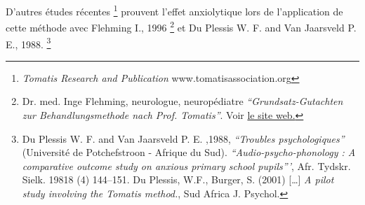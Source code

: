 D'autres études récentes \footnote{\emph{Tomatis Research and Publication} www.tomatisassociation.org}  prouvent l'effet anxiolytique lors de
l'application de cette
méthode avec Flehming
I., 1996 \footnote{Dr. med. Inge Flehming,
	neurologue, neuropédiatre \emph{``Grundsatz-Gutachten zur Behandlungsmethode
		nach Prof. Tomatis''}. Voir 
\href{http://www.analytische-hoertherapie.de/uploads/tx\_templavoila/Grundsatzgu
tachten\_zur\_Behandlungsmethode\_nach\_Prof.\_Tomatis.pdf}{le site
web.}} et Du Plessis W. F. and Van Jaarsveld P. E., 1988.
 \footnote{Du Plessis W. F. and Van Jaarsveld P. E. ,1988, \textit{``Troubles 
psychologiques''} (Université de Potchefstroon
- Afrique du Sud). 
	\textit{``Audio-psycho-phonology : A comparative outcome study on anxious 
primary school pupils'''},  Afr. Tydskr. Sielk. 19818 (4) 144--151. Du Plessis, W.F., Burger, S. (2001) [\ldots]
	\emph{A pilot study involving the Tomatis method.}, Sud Africa J. 
Psychol.}
 

















